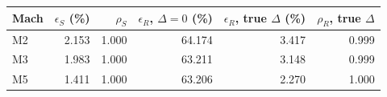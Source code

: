 \begin{tabular}{lrrrrr}
\toprule
Mach & $\epsilon_S$ (\%) & $\rho_S$ & $\epsilon_R$, $\Delta=0$ (\%) & $\epsilon_R$, true $\Delta$ (\%) & $\rho_R$, true $\Delta$ \\
\midrule
M2 & 2.153 & 1.000 & 64.174 & 3.417 & 0.999 \\
M3 & 1.983 & 1.000 & 63.211 & 3.148 & 0.999 \\
M5 & 1.411 & 1.000 & 63.206 & 2.270 & 1.000 \\
\bottomrule
\end{tabular}
